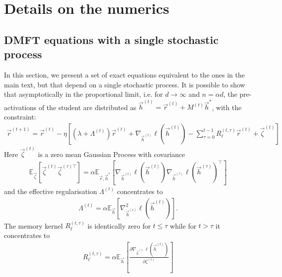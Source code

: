 \section{Details on the numerics}
\label{2402:sec:app:hyperparams}

\subsection{DMFT equations with a single stochastic process}
In this section, we present a set of exact equations equivalent to the ones in the main text, but that depend on a single stochastic process.
 It is possible to show that asymptotically in the proportional limit, i.e. for $d\to\infty$ and $n=\alpha d$, the pre-activations of the student are distributed as $\vec h^{(t)} = \vec r^{(t)} + M^{(t)}\vec h^*$, with the constraint:
\begin{align} \label{2402:eq:r_update}
    \vec r^{(t+1)} = \vec r^{(t)} -\eta \left[ \left(\lambda+\Lambda^{(t)}\right) \vec r^{(t)} + \nabla_{\vec h^{(t)}}\ell\left( \vec h^{(t)}\right)-\sum_{\tau=0}^{t-1} R_\ell^{(t,\tau)}\vec r^{(t)}+\vec\zeta^{(t)}\right]\nonumber
\end{align}
Here $\vec\zeta^{(t)}$ is a zero mean Gaussian Process with covariance
\begin{align}
    \mathbb{E}_{\vec \zeta}\left[\vec\zeta^{(t)} \vec\zeta^{(\tau)\top}\right] = \alpha\mathbb{E}_{\vec r, \vec h^*}\left[\nabla_{\vec h^{(t)}}\ell\left( \vec h^{(t)}\right)\nabla_{\vec h^{(\tau)}}\ell\left( \vec h^{(\tau)}\right)^\top\right]\nonumber
\end{align}
and the effective regularisation $\Lambda^{(t)}$ concentrates to
\begin{align} %
    \Lambda^{(t)} = \alpha\mathbb{E}_{\vec h}\left[\nabla^2_{\vec h^{(t)}}\ell\left( \vec h^{(t)}\right)\right] .
\end{align}
The memory kernel $R_\ell^{(t,\tau)}$ is identically zero for $t\leq \tau$ while for $t > \tau$ it concentrates to
\begin{align} %
    R_\ell^{(t,\tau)} = \alpha \mathbb{E}_{\vec h}\left[\frac{\partial  \nabla_{\vec h^{(t)}}\ell\left( \vec h^{(t)}\right)}{\partial  \zeta^{(\tau)}} \right]
\end{align}
